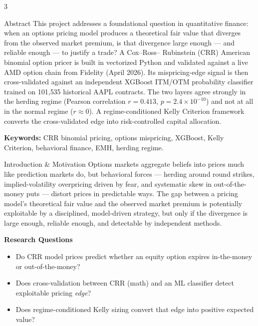 \documentclass[a0,portrait]{a0poster}
\begin{document}
\begin{multicols}{3}


\begin{posterblock}{Abstract}
This project addresses a foundational question in quantitative finance:
when an options pricing model produces a theoretical fair value that
diverges from the observed market premium, is that divergence large
enough --- and reliable enough --- to justify a trade? A Cox--Ross--%
Rubinstein (CRR) American binomial option pricer is built in vectorized
Python and validated against a live AMD option chain from Fidelity
(April 2026). Its mispricing-edge signal is then cross-validated against
an independent XGBoost ITM/OTM probability classifier trained on
101{,}535 historical AAPL contracts. The two layers agree strongly in
the herding regime (Pearson correlation $r=0.413$,
$p=2.4\times10^{-10}$) and not at all in the normal regime ($r\approx0$).
A regime-conditioned Kelly Criterion framework converts the
cross-validated edge into risk-controlled capital allocation.

\vspace{0.4em}
\textbf{Keywords:} CRR binomial pricing, options mispricing, XGBoost,
Kelly Criterion, behavioral finance, EMH, herding regime.
\end{posterblock}

\begin{posterblock}{Introduction \& Motivation}
Options markets aggregate beliefs into prices much like prediction
markets do, but behavioral forces --- herding around round strikes,
implied-volatility overpricing driven by fear, and systematic skew in
out-of-the-money puts --- distort prices in predictable ways. The gap
between a pricing model's theoretical fair value and the observed
market premium is potentially exploitable by a disciplined, model-driven
strategy, but only if the divergence is large enough, reliable enough,
and detectable by independent methods.

\vspace{0.5em}
\textbf{Research Questions}
\begin{itemize}[leftmargin=1.4em,itemsep=4pt,topsep=4pt]
  \item Do CRR model prices predict whether an equity option expires
        in-the-money or out-of-the-money?
  \item Does cross-validation between CRR (math) and an ML classifier
        detect exploitable pricing \emph{edge}?
  \item Does regime-conditioned Kelly sizing convert that edge into
        positive expected value?
\end{itemize}


\end{posterblock}
\end{multicols}
\end{document}
